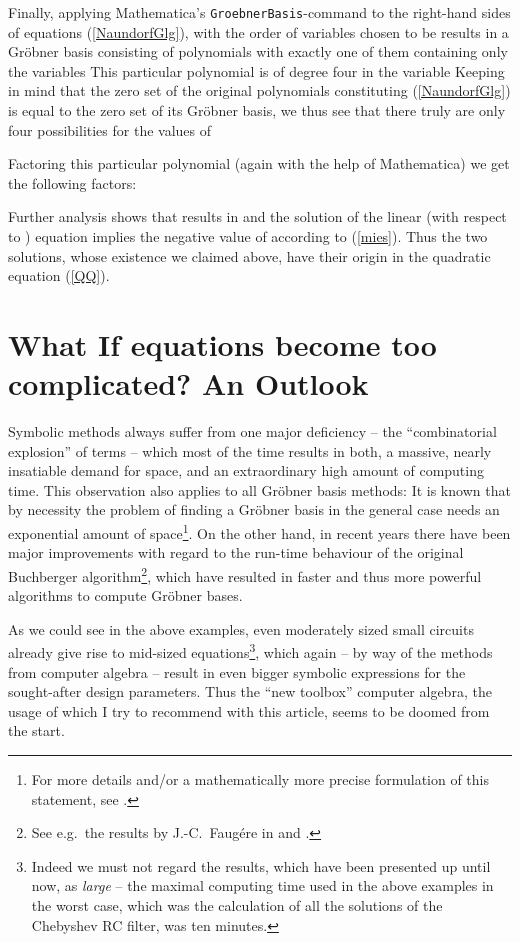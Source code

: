 \documentclass[10pt,twocolumn,pagenumbers]{IEEEtran}
\begin{document}
Finally, applying Mathematica's {\tt GroebnerBasis}-comm\-and to the right-hand sides of equations (\ref{NaundorfGlg}), with the order of variables chosen to be  results in a Gr\"obner basis consisting of  polynomials with exactly one of them containing only the variables  This particular polynomial is of degree four in the variable  Keeping in mind that the zero set of the original polynomials constituting (\ref{NaundorfGlg}) is equal to the zero set of its Gr\"obner basis, we thus see that there truly are only four possibilities for the values of 

Factoring this particular polynomial (again with the help of Mathematica) we get the following factors:
    
Further analysis shows that  results in  and the solution of the linear (with respect to ) equation implies the negative value of  according to (\ref{mies}). Thus the two solutions, whose existence we claimed above, have their origin in the quadratic equation (\ref{QQ}). 

\section{What If equations become too complicated? An Outlook}

Symbolic methods always suffer from one major deficiency -- the ``combinatorial explosion'' of terms -- which most of the time results in both, a massive, nearly insatiable demand for space, and an extraordinary high amount of computing time. This observation also applies to all Gr\"obner basis methods:
It is known that by necessity the problem of finding a Gr\"obner basis in the general case needs an exponential amount of space\footnote{For more details and/or a mathematically more precise formulation of this statement, see \cite{ModernCA}.}. On the other hand, in recent years there have been major improvements with regard to the run-time behaviour of the original Buchberger algorithm\footnote{See e.g.\ the results by J.-C.\ Faug\'ere in \cite{F4} and \cite{F5}.}, which have resulted in faster and thus more powerful algorithms to compute Gr\"obner bases. 

As we could see in the above examples, even moderately sized small circuits already give rise to mid-sized equations\footnote{Indeed we must not regard the results, which have been presented up until now, as {\sl large} -- the maximal computing time used in the above examples in the worst case, which was the calculation of all the solutions of the Chebyshev RC filter, was ten minutes.}, which again -- by way of the methods from computer algebra -- result in even bigger symbolic expressions for the sought-after design parameters. Thus the ``new toolbox'' computer algebra, the usage of which I try to recommend with this article, seems to be doomed from the start.
\end{document}

